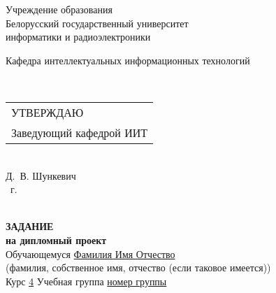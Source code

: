 {
  \thispagestyle{empty}
  \setlength{\parindent}{0em}

  \newcommand{\lineunderscore}{\uline{\hspace*{\fill}}}

  \begin{center}
    Учреждение образования\\
    Белорусский государственный университет\\
    информатики и радиоэлектроники\\[0.5em]
  

  \begin{minipage}{\textwidth}
      Кафедра интеллектуальных информационных технологий
  \end{minipage}\\[2em]

  \begin{minipage}{\textwidth}
    \begin{flushright}
      \begin{tabular}{@{}l@{}}
        УТВЕРЖДАЮ\\[0.5em]
        Заведующий кафедрой ИИТ
      \end{tabular}\\[0.7em]
      \underline{\hspace*{5.3em}} Д.~В. Шункевич\\ [0.5em]
      \underline{\hspace*{1.9em}} \underline{\hspace*{7.8em}} \the\year{}~г.
    \end{flushright}
  \end{minipage}\\[2em]

  \textbf{ЗАДАНИЕ} \\
  \textbf{на дипломный проект}\\[1em]

  Обучающемуся \uline{\hspace*{2em}}\uline{Фамилия Имя Отчество}\lineunderscore \\
  {\footnotesize\hspace{9em}(фамилия, собственное имя, отчество (если таковое имеется))}\\
  
  Курс \uline{4\hspace*{2em}} Учебная группа \uline{номер группы}\lineunderscore\\[0.5em]
  

\end{center}}
